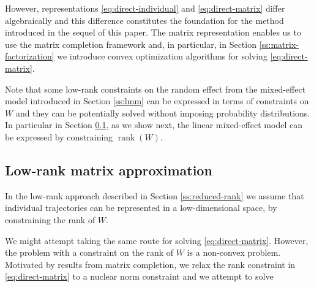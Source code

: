 \documentclass[preprint]{imsart}
\numberwithin{equation}{section}
\theoremstyle{plain}
\newcommand{\N}{\mathbb{N}}
\DeclareMathOperator*{\rank}{rank}
\begin{document}
However, representations \eqref{eq:direct-individual} and \eqref{eq:direct-matrix} differ algebraically and this difference constitutes the foundation for the method introduced in the sequel of this paper. The matrix representation enables us to use the matrix completion framework and, in particular, in Section \ref{ss:matrix-factorization} we introduce convex optimization algorithms for solving \eqref{eq:direct-matrix}. %

Note that some low-rank constraints on the random effect from the mixed-effect model introduced in Section \ref{ss:lmm} can be expressed in terms of constraints on $W$ and they can be potentially solved without imposing probability distributions. In particular in Section \ref{ss:low-rank-matrix}, as we show next, the linear mixed-effect model can be expressed by constraining $\rank(W)$. 

\subsection{Low-rank matrix approximation}\label{ss:low-rank-matrix}
In the low-rank approach described in Section \ref{ss:reduced-rank} we assume that individual trajectories can be represented in a low-dimensional space, by constraining the rank of $W$.

We might attempt taking the same route for solving \eqref{eq:direct-matrix}. However, the problem with a constraint on the rank of $W$ is a non-convex problem. Motivated by results from matrix completion, we relax the rank constraint in \eqref{eq:direct-matrix} to a nuclear norm constraint and we attempt to solve

\end{document}
